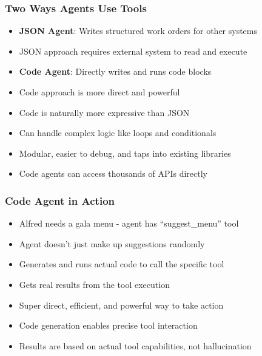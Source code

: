 \begin{frame}[fragile]\frametitle{Two Ways Agents Use Tools}
      \begin{itemize}
        \item \textbf{JSON Agent}: Writes structured work orders for other systems
        \item JSON approach requires external system to read and execute
        \item \textbf{Code Agent}: Directly writes and runs code blocks
        \item Code approach is more direct and powerful
        \item Code is naturally more expressive than JSON
        \item Can handle complex logic like loops and conditionals
        \item Modular, easier to debug, and taps into existing libraries
        \item Code agents can access thousands of APIs directly
      \end{itemize}
\end{frame}

\begin{frame}[fragile]\frametitle{Code Agent in Action}
      \begin{itemize}
        \item Alfred needs a gala menu - agent has ``suggest\_menu'' tool
        \item Agent doesn't just make up suggestions randomly
        \item Generates and runs actual code to call the specific tool
        \item Gets real results from the tool execution
        \item Super direct, efficient, and powerful way to take action
        \item Code generation enables precise tool interaction
        \item Results are based on actual tool capabilities, not hallucination
      \end{itemize}
\end{frame}

